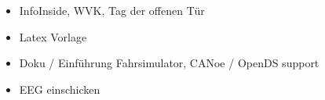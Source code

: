 \label{chap:master_project}
\begin{itemize}
\item InfoInside, WVK, Tag der offenen Tür
\item Latex Vorlage
\item Doku / Einführung Fahrsimulator, CANoe / OpenDS support
\item EEG einschicken
\end{itemize}